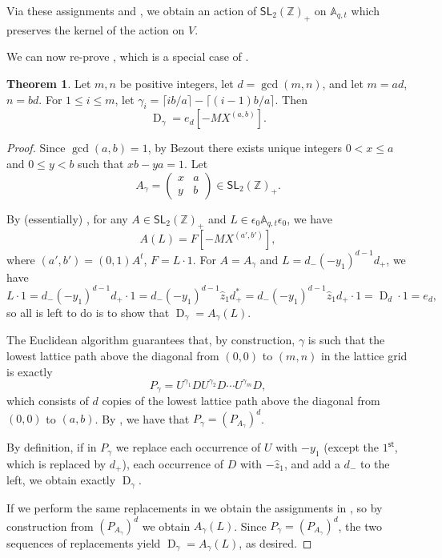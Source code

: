 \documentclass[reqno]{amsart}
\theoremstyle{plain}
\theoremstyle{definition}
\newtheorem{theorem}{Theorem}[section]
\theoremstyle{remark}
\DeclareMathOperator{\D}{D}
\newcommand{\A}{\mathbb{A}}%
\newcommand{\z}{\widehat{z}}
\newcommand{\<}{\langle}
\renewcommand{\>}{\rangle}
\begin{document}
Via these assignments and , we obtain an action of $\mathsf{SL}_2(\mathbb{Z})_+$ on $\A_{q,t}$ which preserves the kernel of the action on $V$.

We can now re-prove \cite[Proposition~3.6.1]{BHMPS2023ShuffleAnyLine}, which is a special case of \cite[Proposition~6.7]{Negut2014ShuffleAlgebra}.

\begin{theorem}
    \label{thm:rational_shuffle}
    Let $m, n$ be positive integers, let $d = \gcd(m,n)$, and let $m = ad$, $n = bd$. For $1 \leq i \leq m$, let $\gamma_i = \lceil ib/a \rceil - \lceil (i-1)b/a \rceil$. Then
    \[ \D_\gamma = e_d \left[ -MX^{(a,b)} \right]. \] 
\end{theorem}

\begin{proof}
    Since $\gcd(a,b) = 1$, by Bezout there exists unique integers $0 < x \leq a$ and $0 \leq y < b$ such that $xb - ya = 1$. Let
    \[ A_\gamma = \begin{pmatrix} x & a \\ y & b \end{pmatrix}  \in \mathsf{SL}_2(\mathbb{Z})_+. \]
    
    By (essentially) \cite[Theorem~3.9, Remark~3.25]{Mellit2021Rational}, for any $A \in \mathsf{SL}_2(\mathbb{Z})_+$ and $L \in \epsilon_0 \A_{q,t} \epsilon_0$, we have \[ A(L) = F \left[ -MX^{(a',b')} \right], \] where $(a', b') = (0,1) A^t$, $F = L \cdot 1$. For $A = A_\gamma$ and $L = d_- (-y_1)^{d-1} d_+$, we have \[ L \cdot 1 = d_- (-y_1)^{d-1} d_+ \cdot 1 = d_- (-y_1)^{d-1} \z_1 d_+^* = d_- (-y_1)^{d-1} \z_1 d_+ \cdot 1 = \D_d \cdot 1 = e_d, \]
    so all is left to do is to show that $\D_\gamma = A_\gamma(L)$.
    
    The Euclidean algorithm guarantees that, by construction, $\gamma$ is such that the lowest lattice path above the diagonal from $(0,0)$ to $(m,n)$ in the lattice grid is exactly \[ P_\gamma = U^{\gamma_1} D U^{\gamma_2} D \cdots U^{\gamma_m} D, \]
    which consists of $d$ copies of the lowest lattice path above the diagonal from $(0,0)$ to $(a,b)$. By , we have that $P_\gamma = (P_{A_\gamma})^d$.

    By definition, if in $P_\gamma$ we replace each occurrence of $U$ with $-y_1$ (except the $1^\mathsf{st}$, which is replaced by $d_+$), each occurrence of $D$ with $-\z_1$, and add a $d_-$ to the left, we obtain exactly $\D_\gamma$.

    If we perform the same replacements in  we obtain the assignments in , so by construction from $(P_{A_\gamma})^d$ we obtain $A_\gamma(L)$. Since $P_\gamma = (P_{A_\gamma})^d$, the two sequences of replacements yield $\D_\gamma = A_\gamma(L)$, as desired.
\end{proof}
\end{document}
